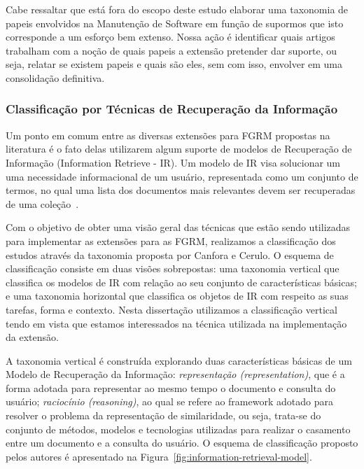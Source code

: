 Cabe ressaltar que está fora do escopo deste estudo elaborar uma taxonomia de papeis envolvidos na
Manutenção de Software em função de supormos que isto corresponde a um esforço bem extenso. Nossa
ação é identificar quais artigos trabalham com a noção de quais papeis a extensão pretender dar
suporte,  ou seja,  relatar se existem papeis e quais são eles,  sem com isso, envolver em uma
consolidação definitiva.

\subsubsection{Classificação por Técnicas de Recuperação da Informação}
\label{subsubsec:map-esaquema-tecnicas-ir}

Um ponto em comum entre as diversas extensões para FGRM propostas na literatura é o fato delas utilizarem algum suporte de modelos de Recuperação de Informação (Information Retrieve - IR). Um modelo de IR visa solucionar um uma necessidade informacional de um usuário, representada como um conjunto de termos, no qual uma lista dos documentos mais relevantes devem ser recuperadas de uma coleção~\cite{baeza1999modern}. 

Com o objetivo de obter uma visão geral das técnicas que estão sendo utilizadas para implementar as
extensões para as FGRM, realizamos a classificação dos estudos através da taxonomia proposta por
Canfora e Cerulo\cite{cerulo2004taxonomy}. O esquema de classificação consiste em duas visões
sobrepostas: uma taxonomia vertical que classifica os modelos de IR com relação ao seu conjunto
de características básicas; e uma taxonomia horizontal que classifica os objetos de IR com respeito
as suas tarefas, forma e contexto\cite{cerulo2004taxonomy}. Nesta dissertação utilizamos a
classificação vertical tendo em vista que estamos interessados na técnica utilizada na implementação da extensão.



A taxonomia vertical é construída explorando duas características básicas de um Modelo de
Recuperação da Informação: \textit{representação (representation)}, que é a forma adotada para representar ao mesmo
tempo o documento e consulta do usuário; \textit{raciocínio (reasoning)}, ao qual se refere ao framework adotado
para resolver o problema da representação de similaridade, ou seja, trata-se do conjunto de métodos, modelos e tecnologias utilizadas para realizar o casamento entre um documento e a consulta do usuário. O esquema de classificação proposto pelos autores é apresentado na Figura~\ref{fig:information-retrieval-model}.

